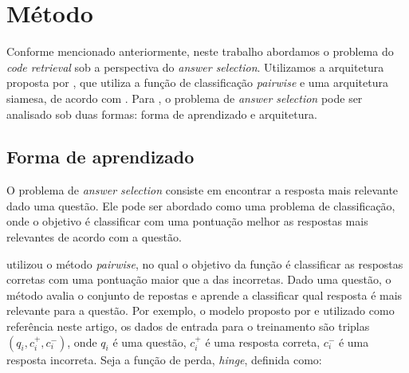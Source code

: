 \documentclass[12pt]{article}
\begin{document}






\section{Método} \label{sec:metodo}

Conforme mencionado anteriormente, neste trabalho abordamos o problema do \textit{code retrieval} sob a perspectiva do \textit{answer selection}. Utilizamos 
a arquitetura proposta por \cite{tan-lstm-qa}, que utiliza a função de classificação \textit{pairwise} e uma arquitetura siamesa, de acordo com \cite{lai-etal-2018-review}. Para 
\cite{lai-etal-2018-review}, o problema de \textit{answer selection} pode ser analisado sob duas formas: forma de aprendizado e arquitetura.

\subsection{Forma de aprendizado}

O problema de \textit{answer selection} consiste em encontrar a resposta mais relevante dado uma questão. Ele pode ser abordado como uma problema de classificação, onde
o objetivo é classificar com uma pontuação melhor as respostas mais relevantes de acordo com a questão.

\cite{tan-lstm-qa} utilizou o método \textit{pairwise}, no qual o objetivo da função é classificar as respostas corretas com uma pontuação maior que a das incorretas. Dado uma questão,
o método avalia o conjunto de repostas e aprende a classificar qual resposta é mais relevante para a questão. Por exemplo, o modelo proposto por \cite{tan-lstm-qa} e utilizado como referência neste artigo, os dados de entrada para o treinamento
são triplas $(q_{i}, c_{i}^{+}, c_{i}^{-})$, onde $q_{i}$ é uma questão, $c_{i}^{+}$ é uma resposta correta, $c_{i}^{-}$ é uma resposta incorreta. Seja a função de perda, \textit{hinge}, definida como:
\end{document}
